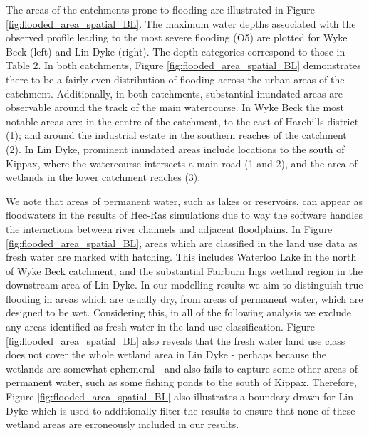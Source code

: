 \documentclass[APA,Times2COL]{WileyNJDv5}
\begin{document}
The areas of the catchments prone to flooding are illustrated in Figure \ref{fig:flooded_area_spatial_BL}. The maximum water depths associated with the observed profile leading to the most severe flooding (O5) are plotted for Wyke Beck (left) and Lin Dyke (right). The depth categories correspond to those in Table 2. In both catchments, Figure \ref{fig:flooded_area_spatial_BL} demonstrates there to be a fairly even distribution of flooding across the urban areas of the catchment. Additionally, in both catchments, substantial inundated areas are observable around the track of the main watercourse. In Wyke Beck the most notable areas are: in the centre of the catchment, to the east of Harehills district (1); and around the industrial estate in the southern reaches of the catchment (2). In Lin Dyke, prominent inundated areas include locations to the south of Kippax, where the watercourse intersects a main road (1 and 2), and the area of wetlands in the lower catchment reaches (3). 

We note that areas of permanent water, such as lakes or reservoirs, can appear as floodwaters in the results of Hec-Ras simulations due to way the software handles the interactions between river channels and adjacent floodplains. In Figure \ref{fig:flooded_area_spatial_BL}, areas which are classified in the land use data as fresh water are marked with hatching. This includes Waterloo Lake in the north of Wyke Beck catchment, and the substantial Fairburn Ings wetland region in the downstream area of Lin Dyke. In our modelling results we aim to distinguish true flooding in areas which are usually dry, from areas of permanent water, which are designed to be wet. Considering this, in all of the following analysis we exclude any areas identified as fresh water in the land use classification. Figure \ref{fig:flooded_area_spatial_BL} also reveals that the fresh water land use class does not cover the whole wetland area in Lin Dyke - perhaps because the wetlands are somewhat ephemeral - and also fails to capture some other areas of permanent water, such as some fishing ponds to the south of Kippax. Therefore, Figure \ref{fig:flooded_area_spatial_BL} also illustrates a boundary drawn for Lin Dyke which is used to additionally filter the results to ensure that none of these wetland areas are erroneously included in our results.  

\end{document}

